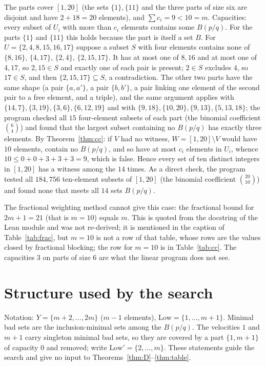 \documentclass[11pt]{article}
\theoremstyle{remark}
\begin{document}
The parts cover $[1,20]$ (the sets $\{1\},\{11\}$ and the three parts of size six are disjoint and have $2+18=20$ elements), and $\sum c_i=9<10=m$. Capacities: every subset of $U_i$ with more than $c_i$ elements contains some $B(p/q)$. For the parts $\{1\}$ and $\{11\}$ this holds because the part is itself a set $B$. For $U=\{2,4,8,15,16,17\}$ suppose a subset $S$ with four elements contains none of $\{8,16\}$, $\{4,17\}$, $\{2,4\}$, $\{2,15,17\}$. It has at most one of $8,16$ and at most one of $4,17$, so $2,15\in S$ and exactly one of each pair is present; $2\in S$ excludes $4$, so $17\in S$, and then $\{2,15,17\}\subseteq S$, a contradiction. The other two parts have the same shape (a pair $\{a,a'\}$, a pair $\{b,b'\}$, a pair linking one element of the second pair to a free element, and a triple), and the same argument applies with $\{14,7\},\{3,19\},\{3,6\},\{6,12,19\}$ and with $\{9,18\},\{10,20\},\{9,13\},\{5,13,18\}$; the program checked all $15$ four-element subsets of each part (the binomial coefficient $\binom{6}{4}$) and found that the largest subset containing no $B(p/q)$ has exactly three elements. By Theorem~\ref{thm:cc}: if $V$ had no witness, $W=[1,20]\setminus V$ would have $10$ elements, contain no $B(p/q)$, and so have at most $c_i$ elements in $U_i$, whence $10\le 0+0+3+3+3=9$, which is false. Hence every set of ten distinct integers in $[1,20]$ has a witness among the $14$ times. As a direct check, the program tested all $184{,}756$ ten-element subsets of $[1,20]$ (the binomial coefficient $\binom{20}{10}$) and found none that meets all $14$ sets $B(p/q)$.

The fractional weighting method cannot give this case: the fractional bound for $2m+1=21$ (that is $m=10$) equals $m$. This is quoted from the docstring of the Lean module and was not re-derived; it is mentioned in the caption of Table~\ref{tab:frac}, but $m=10$ is not a row of that table, whose rows are the values closed by fractional blocking; the row for $m=10$ is in Table~\ref{tab:cc}. The capacities $3$ on parts of size $6$ are what the linear program does not see.

\section{Structure used by the search}\label{sec:search}

Notation: $Y=\{m+2,\dots,2m\}$ ($m-1$ elements), $\mathrm{Low}=\{1,\dots,m+1\}$. Minimal bad sets are the inclusion-minimal sets among the $B(p/q)$. The velocities $1$ and $m+1$ carry singleton minimal bad sets, so they are covered by a part $\{1,m+1\}$ of capacity $0$ and removed; write $\mathrm{Low}'=\{2,\dots,m\}$. These statements guide the search and give no input to Theorems~\ref{thm:D}--\ref{thm:table}.
\end{document}
